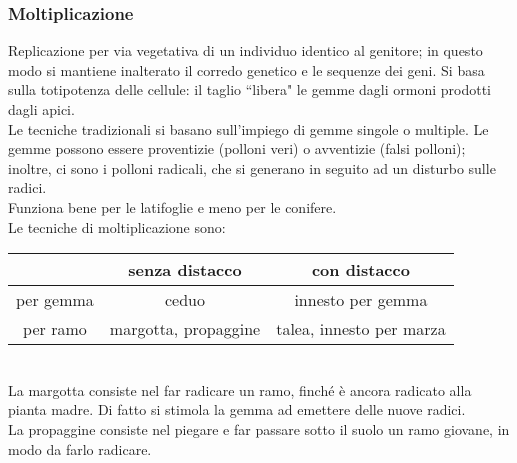 \documentclass{article}
\begin{document}
\subsubsection{Moltiplicazione}
Replicazione per via vegetativa di un individuo identico al genitore; in questo modo si mantiene inalterato il corredo genetico e le sequenze dei geni. Si basa sulla totipotenza delle cellule: il taglio ``libera" le gemme dagli ormoni prodotti dagli apici.\\
Le tecniche tradizionali si basano sull'impiego di gemme singole o multiple. Le gemme possono essere proventizie (polloni veri) o avventizie (falsi polloni); inoltre, ci sono i polloni radicali, che si generano in seguito ad un disturbo sulle radici.\\
Funziona bene per le latifoglie e meno per le conifere.\\
Le tecniche di moltiplicazione sono:
\begin{table}[h] \centering
\begin{tabular}{ccc}
 & senza distacco & con distacco \\
 \midrule
per gemma & ceduo & innesto per gemma \\
\midrule
per ramo & margotta, propaggine & talea, innesto per marza
\end{tabular}
\end{table}\\
La margotta consiste nel far radicare un ramo, finché è ancora radicato alla pianta madre. Di fatto si stimola la gemma ad emettere delle nuove radici.\\
La propaggine consiste nel piegare e far passare sotto il suolo un ramo giovane, in modo da farlo radicare.
\end{document}

